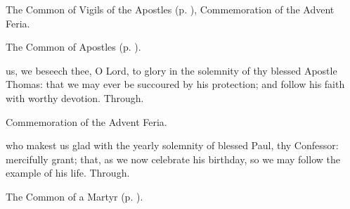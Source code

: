 

\begin{rubric}
	The Common of Vigils of the Apostles (p. \pageref{CommonVigilApostles}), Commemoration of the Advent Feria.
\end{rubric}



\begin{rubric}
	The Common of Apostles (p. \pageref{CommonApostles}).
\end{rubric}


\collect
{} us, we beseech thee, O Lord, to glory in the solemnity of thy blessed Apostle Thomas: that we may ever be succoured by his protection; and follow his faith with worthy devotion. Through.

\begin{rubric}
    Commemoration of the Advent Feria.
\end{rubric}



\memorialCollect
{} who makest us glad with the yearly solemnity of blessed Paul, thy Confessor: mercifully grant; that, as we now celebrate his birthday, so we may follow the example of his life. Through.



\begin{rubric}
	The Common of a Martyr (p. \pageref{CommonMartyrBishopCollect}).
\end{rubric}


